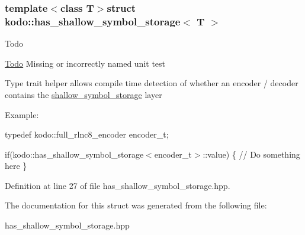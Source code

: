 \subsubsection*{template$<$class T$>$struct kodo\-::has\-\_\-shallow\-\_\-symbol\-\_\-storage$<$ T $>$}

\begin{DoxyRefDesc}{Todo}
\item[\hyperlink{todo__todo000021}{Todo}]Missing or incorrectly named unit test

Type trait helper allows compile time detection of whether an encoder / decoder contains the \hyperlink{classkodo_1_1shallow__symbol__storage}{shallow\-\_\-symbol\-\_\-storage} layer\end{DoxyRefDesc}


Example\-:

typedef kodo\-::full\-\_\-rlnc8\-\_\-encoder encoder\-\_\-t;

if(kodo\-::has\-\_\-shallow\-\_\-symbol\-\_\-storage$<$encoder\-\_\-t$>$\-::value) \{ // Do something here \} 

Definition at line 27 of file has\-\_\-shallow\-\_\-symbol\-\_\-storage.\-hpp.



The documentation for this struct was generated from the following file\-:\begin{DoxyCompactItemize}
\item 
has\-\_\-shallow\-\_\-symbol\-\_\-storage.\-hpp\end{DoxyCompactItemize}
